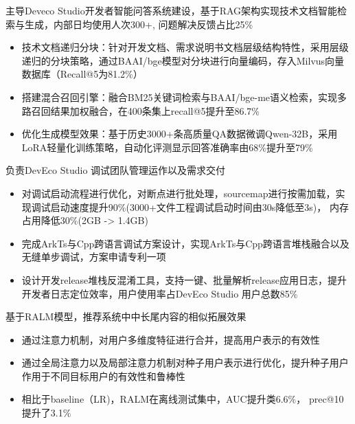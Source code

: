 \documentclass{resume}
\begin{document}
\begin{onehalfspacing}
主导Deveco Studio开发者智能问答系统建设，基于RAG架构实现技术文档智能检索与生成，内部日均使用人次300+, 问题解决反馈占比25\%
\begin{itemize}
  \item 技术文档递归分块：针对开发文档、需求说明书文档层级结构特性，采用层级递归的分块策略，通过BAAI/bge模型对分块进行向量编码，存入Milvus向量数据库（Recall@5为81.2\%）
  \item 搭建混合召回引擎：融合BM25关键词检索与BAAI/bge-me语义检索，实现多路召回结果加权融合，在400条集上recall@5提升至86.7\%
  \item 优化生成模型效果：基于历史3000+条高质量QA数据微调Qwen-32B，采用LoRA轻量化训练策略，自动化评测显示回答准确率由68\%提升至79\%
\end{itemize}

\begin{onehalfspacing}
负责DevEco Studio 调试团队管理运作以及需求交付
\begin{itemize}
  \item 对调试启动流程进行优化，对断点进行批处理，sourcemap进行按需加载，实现调试启动速度提升90\%(3000+文件工程调试启动时间由30s降低至3s)， 内存占用降低30\%(2GB -> 1.4GB)
  \item 完成ArkTs与Cpp跨语言调试方案设计，实现ArkTs与Cpp跨语言堆栈融合以及无缝单步调试，方案申请专利一项
  \item 设计开发release堆栈反混淆工具，支持一键、批量解析release应用日志，提升开发者日志定位效率，用户使用率占DevEco Studio 用户总数85\%
\end{itemize}
\end{onehalfspacing}

\begin{onehalfspacing}
基于RALM模型，推荐系统中中长尾内容的相似拓展效果
\begin{itemize}
  \item 通过注意力机制，对用户多维度特征进行合并，提高用户表示的有效性
  \item 通过全局注意力以及局部注意力机制对种子用户表示进行优化，提升种子用户作用于不同目标用户的有效性和鲁棒性
  \item 相比于baseline（LR)，RALM在离线测试集中，AUC提升类6.6\%， prec@10提升了3.1\%
\end{itemize}
\end{onehalfspacing}


\end{onehalfspacing}
\end{document}

